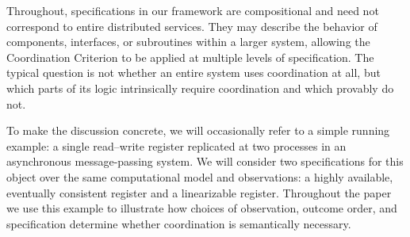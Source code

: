 Throughout, specifications in our framework are compositional and need not
correspond to entire distributed services.
They may describe the behavior of components, interfaces, or subroutines
within a larger system, allowing the Coordination Criterion to be applied
at multiple levels of specification.
The typical question is not whether an entire system uses coordination at all, but
which parts of its logic intrinsically require coordination and which
provably do not.

To make the discussion concrete, we will occasionally refer to a simple
running example: a single read--write register replicated at two processes
in an asynchronous message-passing system.
We will consider two specifications for this object over the same
computational model and observations: a highly available, eventually
consistent register and a linearizable register.
Throughout the paper we use this example to illustrate how choices of
observation, outcome order, and specification determine whether
coordination is semantically necessary.